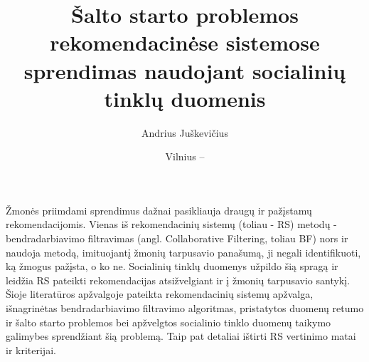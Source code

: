 \documentclass{VUMIFInfMagistrinis}
\title{Šalto starto problemos rekomendacinėse sistemose sprendimas naudojant socialinių tinklų duomenis}
\author{Andrius Juškevičius}
\date{Vilnius – \the\year}
\begin{document}
\maketitle


Žmonės priimdami sprendimus dažnai pasikliauja draugų ir pažįstamų rekomendacijomis. Vienas iš rekomendacinių sistemų (toliau - RS) metodų - bendradarbiavimo filtravimas (angl. Collaborative Filtering, toliau BF) nors ir naudoja metodą, imituojantį žmonių tarpusavio panašumą, ji negali identifikuoti, ką žmogus pažįsta, o ko ne. Socialinių tinklų duomenys užpildo šią spragą ir leidžia RS pateikti rekomendacijas atsižvelgiant ir į žmonių tarpusavio santykį. 
\newline
\indent
Šioje literatūros apžvalgoje pateikta rekomendacinių sistemų apžvalga, išnagrinėtas bendradarbiavimo filtravimo algoritmas, pristatytos duomenų retumo ir šalto starto problemos bei apžvelgtos socialinio tinklo duomenų taikymo galimybes sprendžiant šią problemą. Taip pat detaliai ištirti RS vertinimo matai ir kriterijai.

\tableofcontents
\end{document}
